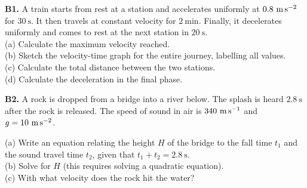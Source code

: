 \begin{exercisebox}[3]
\textbf{B1.} A train starts from rest at a station and
accelerates uniformly at $0.8\ \text{m\,s}^{-2}$ for
$30\ \text{s}$. It then travels at constant velocity for
$2\ \text{min}$. Finally, it decelerates uniformly and
comes to rest at the next station in $20\ \text{s}$.\\[4pt]
(a) Calculate the maximum velocity reached.\\
(b) Sketch the velocity-time graph for the entire journey,
labelling all values.\\
(c) Calculate the total distance between the two
stations.\\
(d) Calculate the deceleration in the final phase.
\hfill{}

\vspace{0.4cm}

\textbf{B2.} A rock is dropped from a bridge into a
river below. The splash is heard $2.8\ \text{s}$ after
the rock is released. The speed of sound in air is
$340\ \text{m\,s}^{-1}$ and $g = 10\ \text{m\,s}^{-2}$.\\[4pt]
\begin{center}
\end{center}
(a) Write an equation relating the height $H$ of the
bridge to the fall time $t_1$ and the sound travel
time $t_2$, given that $t_1 + t_2 = 2.8\ \text{s}$.\\
(b) Solve for $H$ (this requires solving a quadratic
equation).\\
(c) With what velocity does the rock hit the water?
\hfill{}

\vspace{0.4cm}


\end{exercisebox}
